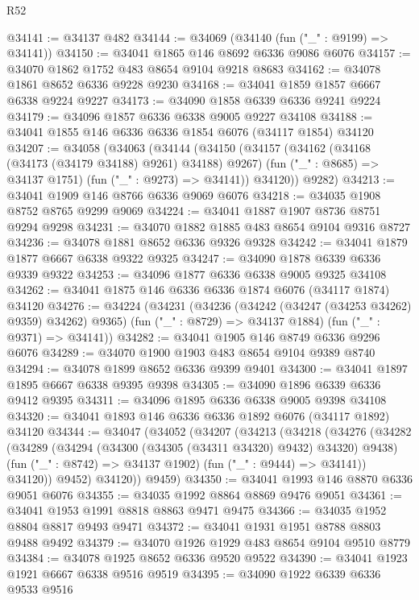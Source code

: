 \begin{lexlean}{R52}
\begin{coremodule}
@34141 := @34137 @482
@34144 := @34069 (@34140 (fun ("_" : @9199) => @34141))
@34150 := @34041 @1865 @146 @8692 @6336 @9086 @6076
@34157 := @34070 @1862 @1752 @483 @8654 @9104 @9218 @8683
@34162 := @34078 @1861 @8652 @6336 @9228 @9230
@34168 := @34041 @1859 @1857 @6667 @6338 @9224 @9227
@34173 := @34090 @1858 @6339 @6336 @9241 @9224
@34179 := @34096 @1857 @6336 @6338 @9005 @9227 @34108
@34188 := @34041 @1855 @146 @6336 @6336 @1854 @6076 (@34117 @1854) @34120
@34207 := @34058
    (@34063
      (@34144
        (@34150
          (@34157
            (@34162 (@34168 (@34173 (@34179 @34188) @9261) @34188) @9267)
            (fun ("_" : @8685) => @34137 @1751)
            (fun ("_" : @9273) => @34141))
          @34120))
      @9282)
@34213 := @34041 @1909 @146 @8766 @6336 @9069 @6076
@34218 := @34035 @1908 @8752 @8765 @9299 @9069
@34224 := @34041 @1887 @1907 @8736 @8751 @9294 @9298
@34231 := @34070 @1882 @1885 @483 @8654 @9104 @9316 @8727
@34236 := @34078 @1881 @8652 @6336 @9326 @9328
@34242 := @34041 @1879 @1877 @6667 @6338 @9322 @9325
@34247 := @34090 @1878 @6339 @6336 @9339 @9322
@34253 := @34096 @1877 @6336 @6338 @9005 @9325 @34108
@34262 := @34041 @1875 @146 @6336 @6336 @1874 @6076 (@34117 @1874) @34120
@34276 := @34224
    (@34231
      (@34236 (@34242 (@34247 (@34253 @34262) @9359) @34262) @9365)
      (fun ("_" : @8729) => @34137 @1884)
      (fun ("_" : @9371) => @34141))
@34282 := @34041 @1905 @146 @8749 @6336 @9296 @6076
@34289 := @34070 @1900 @1903 @483 @8654 @9104 @9389 @8740
@34294 := @34078 @1899 @8652 @6336 @9399 @9401
@34300 := @34041 @1897 @1895 @6667 @6338 @9395 @9398
@34305 := @34090 @1896 @6339 @6336 @9412 @9395
@34311 := @34096 @1895 @6336 @6338 @9005 @9398 @34108
@34320 := @34041 @1893 @146 @6336 @6336 @1892 @6076 (@34117 @1892) @34120
@34344 := @34047
    (@34052
      (@34207
        (@34213
          (@34218
            (@34276
              (@34282
                (@34289
                  (@34294 (@34300 (@34305 (@34311 @34320) @9432) @34320) @9438)
                  (fun ("_" : @8742) => @34137 @1902)
                  (fun ("_" : @9444) => @34141))
                @34120))
            @9452)
          @34120))
      @9459)
@34350 := @34041 @1993 @146 @8870 @6336 @9051 @6076
@34355 := @34035 @1992 @8864 @8869 @9476 @9051
@34361 := @34041 @1953 @1991 @8818 @8863 @9471 @9475
@34366 := @34035 @1952 @8804 @8817 @9493 @9471
@34372 := @34041 @1931 @1951 @8788 @8803 @9488 @9492
@34379 := @34070 @1926 @1929 @483 @8654 @9104 @9510 @8779
@34384 := @34078 @1925 @8652 @6336 @9520 @9522
@34390 := @34041 @1923 @1921 @6667 @6338 @9516 @9519
@34395 := @34090 @1922 @6339 @6336 @9533 @9516

\end{coremodule}
\end{lexlean}
